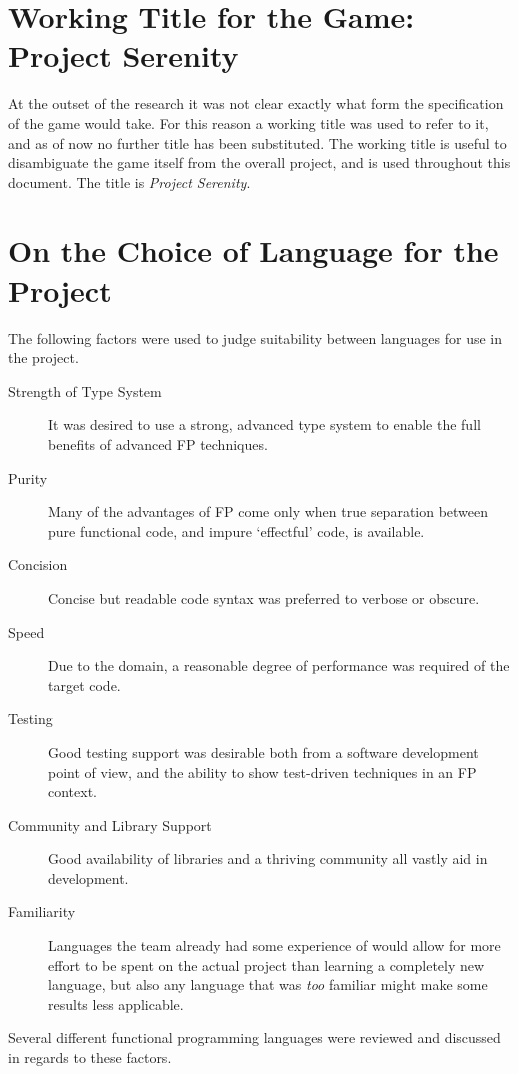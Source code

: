\section{Working Title for the Game: Project Serenity}

At the outset of the research it was not clear exactly what form the specification of the game would take. For this reason a working title was used to refer to it, and as of now no further title has been substituted. The working title is useful to disambiguate the game itself from the overall project, and is used throughout this document. The title is \emph{Project Serenity}.

\section{On the Choice of Language for the Project}

The following factors were used to judge suitability between languages for use in the project.

\begin{description}
	\item[Strength of Type System] It was desired to use a strong, advanced type system to enable the full benefits of advanced FP techniques.
	\item[Purity] Many of the advantages of FP come only when true separation between pure functional code, and impure `effectful' code, is available.\cite[-10em]{hudak1989conception}
	\item[Concision] Concise but readable code syntax was preferred to verbose or obscure.
	\item[Speed] Due to the domain, a reasonable degree of performance was required of the target code.
	\item[Testing] Good testing support was desirable both from a software development point of view, and the ability to show test-driven techniques in an FP context.
	\item[Community and Library Support] Good availability of libraries and a thriving community all vastly aid in development.
	\item[Familiarity] Languages the team already had some experience of would allow for more effort to be spent on the actual project than learning a completely new language, but also any language that was \emph{too} familiar might make some results less applicable.
\end{description}
\noindent
Several different functional programming languages were reviewed and discussed in regards to these factors.

